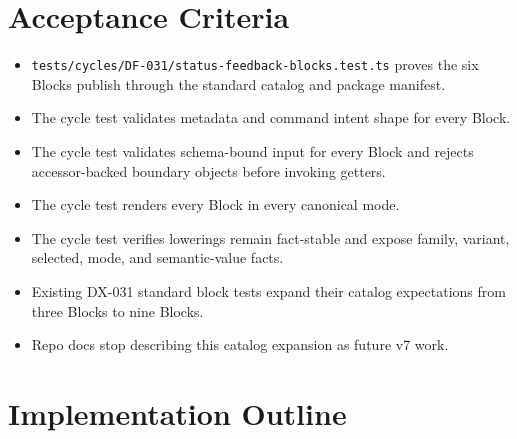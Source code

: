 \section{Acceptance Criteria}\label{record-092-acceptance-criteria}

\begin{itemize}
\tightlist
\item
  \texttt{t\allowbreak{}e\allowbreak{}s\allowbreak{}t\allowbreak{}s\allowbreak{}/\allowbreak{}c\allowbreak{}y\allowbreak{}c\allowbreak{}l\allowbreak{}e\allowbreak{}s\allowbreak{}/\allowbreak{}D\allowbreak{}F\allowbreak{}-\allowbreak{}0\allowbreak{}3\allowbreak{}1\allowbreak{}/\allowbreak{}s\allowbreak{}t\allowbreak{}a\allowbreak{}t\allowbreak{}u\allowbreak{}s\allowbreak{}-\allowbreak{}f\allowbreak{}e\allowbreak{}e\allowbreak{}d\allowbreak{}b\allowbreak{}a\allowbreak{}c\allowbreak{}k\allowbreak{}-\allowbreak{}b\allowbreak{}l\allowbreak{}o\allowbreak{}c\allowbreak{}k\allowbreak{}s\allowbreak{}.\allowbreak{}t\allowbreak{}e\allowbreak{}s\allowbreak{}t\allowbreak{}.\allowbreak{}t\allowbreak{}s} proves the six Blocks publish through the standard catalog and package manifest.
\item
  The cycle test validates metadata and command intent shape for every Block.
\item
  The cycle test validates schema-bound input for every Block and rejects accessor-backed boundary objects before invoking getters.
\item
  The cycle test renders every Block in every canonical mode.
\item
  The cycle test verifies lowerings remain fact-stable and expose family, variant, selected, mode, and semantic-value facts.
\item
  Existing DX-031 standard block tests expand their catalog expectations from three Blocks to nine Blocks.
\item
  Repo docs stop describing this catalog expansion as future v7 work.
\end{itemize}

\section{Implementation Outline}\label{record-092-implementation-outline}

